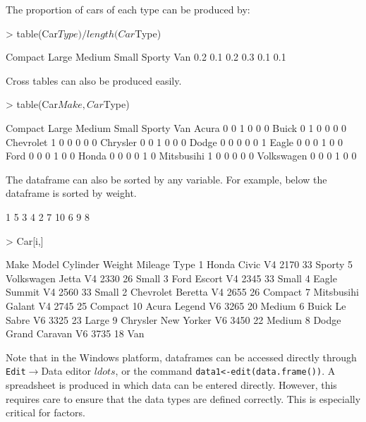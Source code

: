\documentclass[12pt,A4,makeidx]{article}
\begin{document}
The proportion of cars of each type can be produced by:
\begin{Schunk}
\begin{Sinput}
> table(Car$Type)/length(Car$Type)
\end{Sinput}
\begin{Soutput}
Compact   Large  Medium   Small  Sporty     Van 
    0.2     0.1     0.2     0.3     0.1     0.1 
\end{Soutput}
\end{Schunk}
Cross tables can also be produced easily.
\begin{Schunk}
\begin{Sinput}
> table(Car$Make, Car$Type)
\end{Sinput}
\begin{Soutput}
             Compact Large Medium Small Sporty Van
  Acura            0     0      1     0      0   0
  Buick            0     1      0     0      0   0
  Chevrolet        1     0      0     0      0   0
  Chrysler         0     0      1     0      0   0
  Dodge            0     0      0     0      0   1
  Eagle            0     0      0     1      0   0
  Ford             0     0      0     1      0   0
  Honda            0     0      0     0      1   0
  Mitsbusihi       1     0      0     0      0   0
  Volkswagen       0     0      0     1      0   0
\end{Soutput}
\end{Schunk}
The dataframe can also be sorted by any variable. For example, below the dataframe is sorted by weight.
\begin{Schunk}
\begin{Soutput}
 [1]  1  5  3  4  2  7 10  6  9  8
\end{Soutput}
\begin{Sinput}
> Car[i,] 
\end{Sinput}
\begin{Soutput}
         Make         Model Cylinder Weight Mileage    Type
1       Honda         Civic       V4   2170      33  Sporty
5  Volkswagen         Jetta       V4   2330      26   Small
3        Ford        Escort       V4   2345      33   Small
4       Eagle        Summit       V4   2560      33   Small
2   Chevrolet       Beretta       V4   2655      26 Compact
7  Mitsbusihi        Galant       V4   2745      25 Compact
10      Acura        Legend       V6   3265      20  Medium
6       Buick      Le Sabre       V6   3325      23   Large
9    Chrysler    New Yorker       V6   3450      22  Medium
8       Dodge Grand Caravan       V6   3735      18     Van
\end{Soutput}
\end{Schunk}
Note that in the Windows platform,
dataframes can be accessed directly through \texttt{Edit}$\rightarrow${Data editor} $ldots$, or the command
\texttt{data1<-edit(data.frame())}.
A spreadsheet is produced in which data can be entered directly. However, this requires care to ensure that the 
data types are
defined correctly. This is especially critical for factors.
\end{document}
